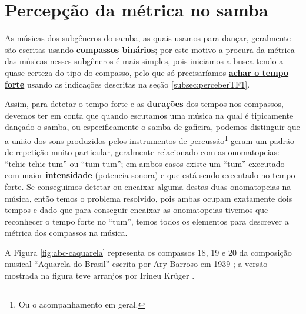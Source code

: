 \section{Percepção da métrica no samba}
\label{sec:percepcaosamba1}

As músicas dos subgêneros do samba, as quais usamos para dançar, 
geralmente são escritas usando \hyperref[subsec:compassobinario]{\textbf{compassos binários}};
por este motivo a procura da métrica das músicas nesses subgêneros 
é mais simples, 
pois iniciamos a busca tendo a quase certeza do tipo do compasso, 
pelo que só precisaríamos \hyperref[subsec:perceberTF1]{\textbf{achar o tempo forte}} 
usando as indicações descritas na seção \ref{subsec:perceberTF1}.

Assim, para detetar o tempo forte e as \hyperref[sec:pos:Duracion]{\textbf{durações}} dos tempos nos compassos,
devemos ter em conta que quando escutamos uma música 
na qual é tipicamente dançado o samba, ou especificamente o samba de gafieira,
podemos distinguir que a união dos sons produzidos pelos instrumentos de percussão\footnote{Ou o
acompanhamento em geral.} 
geram um padrão de repetição muito particular, 
geralmente relacionado com as onomatopeias: ``tchic tchic tum'' ou ``tum tum''; 
em ambos  casos existe um  ``tum'' executado com maior 
\hyperref[sec:pos:Intensidade]{\textbf{intensidade}} (potencia sonora) e
que está sendo executado no tempo forte.
Se conseguimos detetar ou encaixar alguma destas duas onomatopeias na música,
então temos o problema resolvido, pois ambas ocupam exatamente dois tempos 
e dado que para conseguir encaixar as onomatopeias tivemos que reconhecer o tempo forte no ``tum'',
temos todos os elementos para descrever a métrica dos compassos na música.


A Figura \ref{fig:abc-caquarela} representa os compassos 18, 19 e 20 da  
composição musical ``Aquarela do Brasil'' escrita
por Ary Barroso em 1939 \cite{AquarelaDoBrasil}; 
a versão mostrada na figura teve arranjos por Irineu Krüger \cite{Irineu}.\\ 


